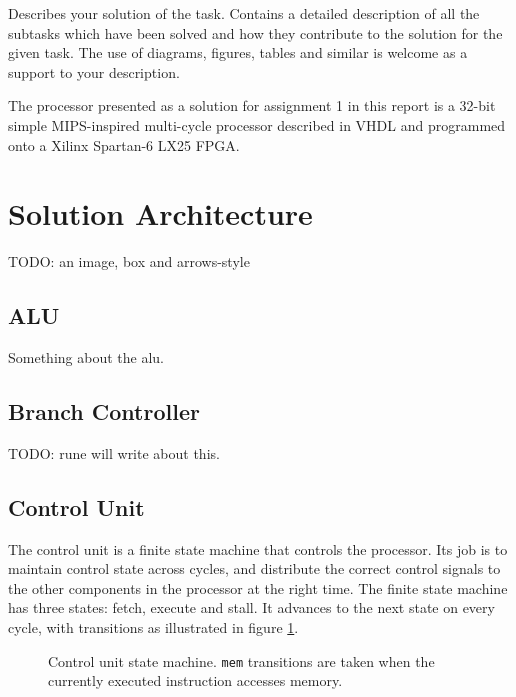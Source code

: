 Describes your solution of the task.
Contains a detailed description of all the subtasks which have been solved and how they contribute to the solution for the given task.
The use of diagrams, figures, tables and similar is welcome as a support to your description.

The processor presented as a solution for assignment 1 in this report is a 32-bit simple MIPS-inspired multi-cycle processor described in VHDL and programmed onto a Xilinx Spartan-6 LX25 FPGA.

\section{Solution Architecture}

TODO: an image, box and arrows-style

\subsection{ALU}

Something about the alu.

\subsection{Branch Controller}

TODO: rune will write about this.

\subsection{Control Unit}

The control unit is a finite state machine that controls the processor.
Its job is to maintain control state across cycles, and distribute the correct control signals to the other components in the processor at the right time.
The finite state machine has three states: fetch, execute and stall.
It advances to the next state on every cycle, with transitions as illustrated in figure \ref{figure:control-unit-state-machine}.

\begin{figure}[h]
    \begin{center}
            \caption{
                Control unit state machine.
                \texttt{mem} transitions are taken when the currently executed instruction accesses memory.
            }
            \label{figure:control-unit-state-machine}
    \end{center}
\end{figure}

